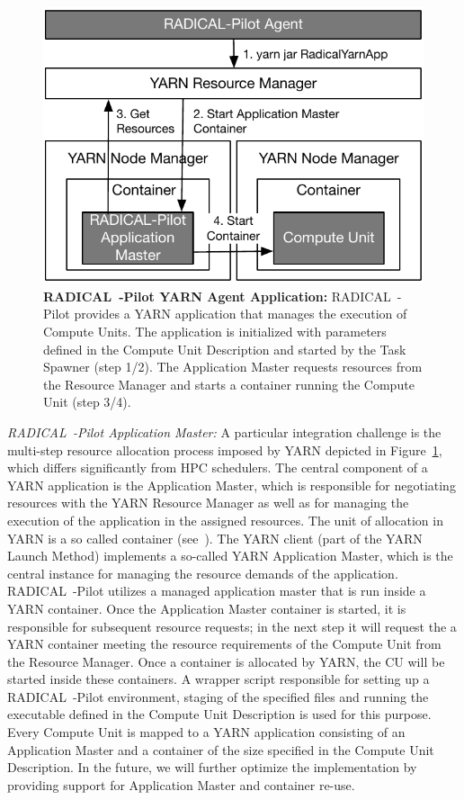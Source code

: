 \begin{figure}[t]
    \centering
    \includegraphics[width=.95\textwidth]{figures/data_analytics_hpc/hpc_hadoop/yarn.pdf}
    \caption{\textbf{RADICAL~-Pilot YARN Agent Application: }
        RADICAL~-Pilot provides a YARN application that manages the execution of Compute Units.
        The application is initialized with parameters defined in the Compute Unit Description and started by the Task Spawner (step 1/2).
        The Application Master requests resources from the Resource Manager and starts a container running the Compute Unit (step 3/4).}
    \label{fig:figures_yarn}
\end{figure}

\emph{RADICAL~-Pilot Application Master:}
A particular integration challenge is the multi-step resource allocation process imposed by YARN depicted in Figure~\ref{fig:figures_yarn}, which differs significantly from HPC schedulers.
The central component of a YARN application is the Application Master, which is responsible for negotiating resources with the YARN Resource Manager as well as for managing the execution of the application in the assigned resources.
The unit of allocation in YARN is a so called container (see~\cite{murthy2014apache}).
The YARN client (part of the YARN Launch Method) implements a so-called YARN Application Master, which is the central instance for managing the resource demands of the application.
RADICAL~-Pilot utilizes a managed application master that is run inside a YARN container.
Once the Application Master container is started, it is responsible for subsequent resource requests; in the next step it will request the a YARN container meeting the resource requirements of the Compute Unit from the Resource Manager.
Once a container is allocated by YARN, the CU will be started inside these containers.
A wrapper script responsible for setting up a RADICAL~-Pilot environment, staging of the specified files and running the executable defined in the Compute Unit Description is used for this purpose.
Every Compute Unit is mapped to a YARN application consisting of an Application Master and a container of the size specified in the Compute Unit Description.
In the future, we will further optimize the implementation by providing support for Application Master and container re-use.


